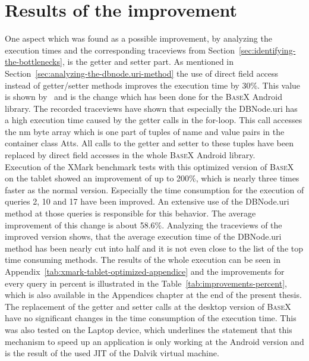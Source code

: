 \section{Results of the improvement}
\label{sec:improving}
One aspect which was found as a possible improvement, by analyzing the execution times and the corresponding traceviews from Section~\ref{sec:identifying-the-bottlenecks}, is the getter and setter part.
As mentioned in Section~\ref{sec:analyzing-the-dbnode.uri-method} the use of direct field access instead of getter/setter methods improves the execution time by 30\%.
This value is shown by~\cite{toninievlautatingandroid} and is the change which has been done for the \textsc{BaseX} Android library.
The recorded traceviews have shown that especially the \textsf{DBNode.uri} has a high execution time caused by the getter calls in the for-loop.
This call accesses the \textsf{nm} byte array which is one part of tuples of name and value pairs in the container class \textsf{Atts}.
All calls to the getter and setter to these tuples have been replaced by direct field accesses in the whole \textsc{BaseX} Android library.\\
Execution of the XMark benchmark tests with this optimized version of \textsc{BaseX} on the tablet showed an improvement of up to 200\%, which is nearly three times faster as the normal version.
Especially the time consumption for the execution of queries 2, 10 and 17 have been improved.
An extensive use of the \textsf{DBNode.uri} method at those queries is responsible for this behavior.
The average improvement of this change is about 58.6\%.
Analyzing the traceviews of the improved version shows, that the average execution time of the \textsf{DBNode.uri} method has been nearly cut into half and it is not even close to the list of the top time consuming methods.
The results of the whole execution can be seen in Appendix~\ref{tab:xmark-tablet-optimized-appendice} and the improvements for every query in percent is illustrated in the Table~\ref{tab:improvements-percent}, which is also available in the Appendices chapter at the end of the present thesis.\\
The replacement of the getter and setter calls at the desktop version of \textsc{BaseX} have no significant changes in the time consumption of the execution time.
This was also tested on the Laptop device, which underlines the statement that this mechanism to speed up an application is only working at the Android version and is the result of the used JIT of the Dalvik virtual machine.
